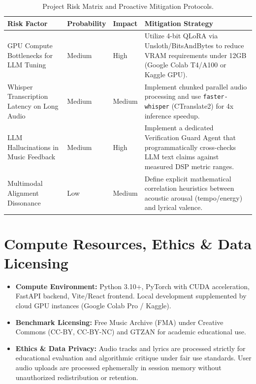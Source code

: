 \documentclass[11pt,a4paper]{article}
\begin{document}
\begin{table}[htbp]
\centering
\small
\renewcommand{\arraystretch}{1.25}
\begin{tabularx}{\textwidth}{p{3.5cm} p{1.6cm} p{1.4cm} X}
\toprule
\rowcolor{tableheader}
\textbf{Risk Factor} & \textbf{Probability} & \textbf{Impact} & \textbf{Mitigation Strategy} \\
\midrule
GPU Compute Bottlenecks for LLM Tuning & Medium & High & Utilize 4-bit QLoRA via Unsloth/BitsAndBytes to reduce VRAM requirements under 12GB (Google Colab T4/A100 or Kaggle GPU). \\
Whisper Transcription Latency on Long Audio & Medium & Medium & Implement chunked parallel audio processing and use \texttt{faster-whisper} (CTranslate2) for 4x inference speedup. \\
LLM Hallucinations in Music Feedback & Medium & High & Implement a dedicated Verification Guard Agent that programmatically cross-checks LLM text claims against measured DSP metric ranges. \\
Multimodal Alignment Dissonance & Low & Medium & Define explicit mathematical correlation heuristics between acoustic arousal (tempo/energy) and lyrical valence. \\
\bottomrule
\end{tabularx}
\caption{Project Risk Matrix and Proactive Mitigation Protocols.}
\label{tab:risks}
\end{table}

\section{Compute Resources, Ethics \& Data Licensing}

\begin{itemize}
    \item \textbf{Compute Environment:} Python 3.10+, PyTorch with CUDA acceleration, FastAPI backend, Vite/React frontend. Local development supplemented by cloud GPU instances (Google Colab Pro / Kaggle).
    \item \textbf{Benchmark Licensing:} Free Music Archive (FMA) under Creative Commons (CC-BY, CC-BY-NC) and GTZAN for academic educational use.
    \item \textbf{Ethics \& Data Privacy:} Audio tracks and lyrics are processed strictly for educational evaluation and algorithmic critique under fair use standards. User audio uploads are processed ephemerally in session memory without unauthorized redistribution or retention.
\end{itemize}
\end{document}
